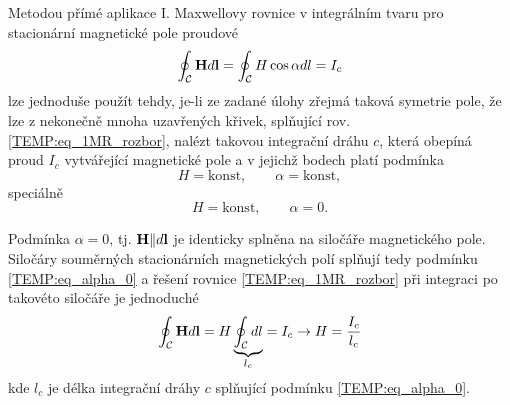     Metodou přímé aplikace I. Maxwellovy rovnice v integrálním tvaru pro stacionární magnetické
    pole proudové
      \begin{equation}\label{TEMP:eq_1MR_rozbor}
        \oint_\mathcal{C}\mathbf{H}d\mathbf{l} = \oint_\mathcal{C}H\cos\alpha dl = I_c
      \end{equation}    
    lze jednoduše použít tehdy, je-li ze zadané úlohy zřejmá taková symetrie pole, že lze z nekonečně mnoha 
    uzavřených křivek, splňující rov. \ref{TEMP:eq_1MR_rozbor}, nalézt takovou integrační dráhu $c$, která 
    obepíná proud $I_c$ vytvářející magnetické pole a v jejichž bodech platí podmínka
      \begin{equation}\label{TEMP:eq_H_alpha_konst}
        H = \text{konst}, \qquad \alpha = \text{konst},
      \end{equation}    
    speciálně
      \begin{equation}\label{TEMP:eq_alpha_0}
        H = \text{konst}, \qquad \alpha = 0.
      \end{equation}
    
    Podmínka $\alpha = 0$, tj. $\mathbf{H}\| d\mathbf{l}$ je identicky splněna na siločáře magnetického pole. 
    Siločáry souměrných stacionárních magnetických polí splňují tedy podmínku \ref{TEMP:eq_alpha_0} a řešení 
    rovnice \ref{TEMP:eq_1MR_rozbor} při integraci po takovéto siločáře je jednoduché
      \begin{equation}\label{TEMP:eq_1MR_alpha0}
        \oint_\mathcal{C}\mathbf{H}d\mathbf{l} = H\underbrace{\oint_\mathcal{C} dl}_{l_c} = 
                                         I_c \rightarrow H = \frac{I_c}{l_c}
      \end{equation}            
    kde $l_c$ je délka integrační dráhy $c$ splňující podmínku \ref{TEMP:eq_alpha_0}.
      
